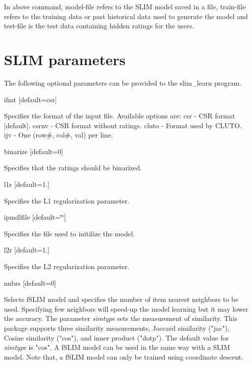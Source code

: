 In above command, {\ttfamily model-\/file} refers to the S\+L\+IM model saved in a file, {\ttfamily train-\/file} refers to the training data or past historical data used to generate the model and {\ttfamily test-\/file} is the test data containing hidden ratings for the users.\hypertarget{index_parameters}{}\section{S\+L\+I\+M parameters}\label{index_parameters}
The following optional parameters can be provided to the {\ttfamily slim\+\_\+learn} program.
\begin{DoxyItemize}
\item ifmt \mbox{[}default=csr\mbox{]}
\begin{DoxyItemize}
\item Specifies the format of the input file. Available options are\+: csr -\/ C\+SR format \mbox{[}default\mbox{]}. csrnv -\/ C\+SR format without ratings. cluto -\/ Format used by C\+L\+U\+TO. ijv -\/ One (row\#, col\#, val) per line.
\end{DoxyItemize}
\item binarize \mbox{[}default=0\mbox{]}
\begin{DoxyItemize}
\item Specifies that the ratings should be binarized.
\end{DoxyItemize}
\item l1r \mbox{[}default=1.\mbox{]}
\begin{DoxyItemize}
\item Specifies the L1 regularization parameter.
\end{DoxyItemize}
\item ipmdlfile \mbox{[}default=\char`\"{}\char`\"{}\mbox{]}
\begin{DoxyItemize}
\item Specifies the file used to initilize the model.
\end{DoxyItemize}
\item l2r \mbox{[}default=1.\mbox{]}
\begin{DoxyItemize}
\item Specifies the L2 regularization parameter.
\end{DoxyItemize}
\item nnbrs \mbox{[}default=0\mbox{]}
\begin{DoxyItemize}
\item Selects f\+S\+L\+IM model and specifies the number of item nearest neighbors to be used. Specifying few neighbors will speed-\/up the model learning but it may lower the accuracy. The parameter {\itshape simtype} sets the measurement of similarity. This package supports three similarity measurements, Jaccard similarity ("jac"), Cosine similarity ("cos"), and inner product ("dotp"). The default value for {\itshape simtype} is "cos". A f\+S\+L\+IM model can be used in the same way with a S\+L\+IM model. Note that, a f\+S\+L\+IM model can only be trained using coordinate descent.

\end{DoxyItemize}
\end{DoxyItemize}

